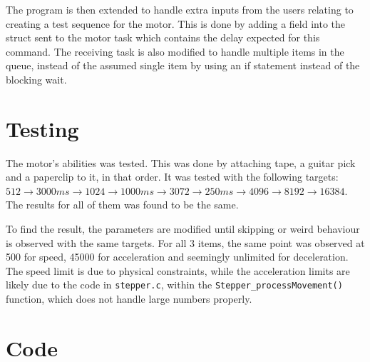 \documentclass{article}
\begin{document}
The program is then extended to handle extra inputs from the users relating to creating a test sequence for the motor. This is done by adding a field into the struct sent to the motor task which contains the delay expected for this command. The receiving task is also modified to handle multiple items in the queue, instead of the assumed single item by using an if statement instead of the blocking wait.

\section{Testing}

The motor's abilities was tested. This was done by attaching tape, a guitar pick and a paperclip to it, in that order. It was tested with the following targets: \(512 \rightarrow 3000ms \rightarrow 1024 \rightarrow 1000ms \rightarrow 3072 \rightarrow 250ms\rightarrow 4096 \rightarrow 8192 \rightarrow 16384\). The results for all of them was found to be the same.

To find the result, the parameters are modified until skipping or weird behaviour is observed with the same targets. For all 3 items, the same point was observed at 500 for speed, 45000 for acceleration and seemingly unlimited for deceleration. The speed limit is due to physical constraints, while the acceleration limits are likely due to the code in \verb|stepper.c|, within the \verb|Stepper_processMovement()| function, which does not handle large numbers properly.
\newpage
\appendix
\section{Code}
\inputminted{C}{lab4_main.c}
\end{document}

